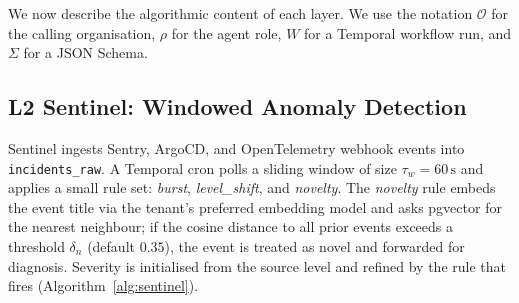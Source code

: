 \documentclass[manuscript,nonacm=true,screen=false,review=false]{acmart}
\begin{document}
We now describe the algorithmic content of each layer. We use the notation \(\mathcal{O}\) for the calling organisation, \(\rho\) for the agent role, \(W\) for a Temporal workflow run, and \(\Sigma\) for a JSON Schema.

\subsection{L2 Sentinel: Windowed Anomaly Detection}

Sentinel ingests Sentry, ArgoCD, and OpenTelemetry webhook events into \texttt{incidents\_raw}. A Temporal cron polls a sliding window of size \(\tau_w = 60\,\text{s}\) and applies a small rule set: \emph{burst}, \emph{level\_shift}, and \emph{novelty}. The \emph{novelty} rule embeds the event title via the tenant's preferred embedding model and asks pgvector for the nearest neighbour; if the cosine distance to all prior events exceeds a threshold \(\delta_n\) (default \(0.35\)), the event is treated as novel and forwarded for diagnosis. Severity is initialised from the source level and refined by the rule that fires (Algorithm~\ref{alg:sentinel}).

\begin{algorithm}
\caption{L2 Sentinel.Detect --- windowed anomaly aggregation}\label{alg:sentinel}
\end{algorithm}
\end{document}
